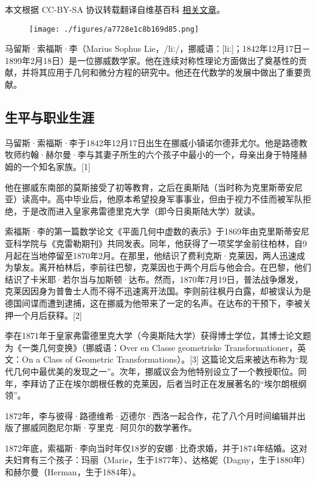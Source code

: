 
本文根据 CC-BY-SA 协议转载翻译自维基百科 \href{https://en.wikipedia.org/wiki/Sophus_Lie}{相关文章}。

\begin{figure}[ht]
\centering
\texttt{[image: ./figures/a7728e1c8b169d85.png]}
\caption{} \label{fig_SFSL_1}
\end{figure}
马留斯·索福斯·李（Marius Sophus Lie，/liː/，挪威语：[liː]；1842年12月17日－1899年2月18日）是一位挪威数学家。他在连续对称性理论方面做出了奠基性的贡献，并将其应用于几何和微分方程的研究中。他还在代数学的发展中做出了重要贡献。
\subsection{生平与职业生涯}
马留斯·索福斯·李于1842年12月17日出生在挪威小镇诺尔德菲尤尔。他是路德教牧师约翰·赫尔曼·李与其妻子所生的六个孩子中最小的一个，母亲出身于特隆赫姆的一个知名家族。[1]

他在挪威东南部的莫斯接受了初等教育，之后在奥斯陆（当时称为克里斯蒂安尼亚）读高中。高中毕业后，他原本希望投身军事事业，但由于视力不佳而被军队拒绝，于是改而进入皇家弗雷德里克大学（即今日奥斯陆大学）就读。

索福斯·李的第一篇数学论文《平面几何中虚数的表示》于1869年由克里斯蒂安尼亚科学院与《克雷勒期刊》共同发表。同年，他获得了一项奖学金前往柏林，自9月起在当地停留至1870年2月。在那里，他结识了费利克斯·克莱因，两人迅速成为挚友。离开柏林后，李前往巴黎，克莱因也于两个月后与他会合。在巴黎，他们结识了卡米耶·若尔当与加斯顿·达布。然而，1870年7月19日，普法战争爆发，克莱因因身为普鲁士人而不得不迅速离开法国。李则前往枫丹白露，却被误认为是德国间谍而遭到逮捕，这在挪威为他带来了一定的名声。在达布的干预下，李被关押一个月后获释。[2]

李在1871年于皇家弗雷德里克大学（今奥斯陆大学）获得博士学位，其博士论文题为《一类几何变换》（挪威语：Over en Classe geometriske Transformationer，英文：On a Class of Geometric Transformations）。[3] 这篇论文后来被达布称为“现代几何中最优美的发现之一”。次年，挪威议会为他特别设立了一个教授职位。同年，李拜访了正在埃尔朗根任教的克莱因，后者当时正在发展著名的“埃尔朗根纲领”。

1872年，李与彼得·路德维希·迈德尔·西洛一起合作，花了八个月时间编辑并出版了挪威同胞尼尔斯·亨里克·阿贝尔的数学著作。

1872年底，索福斯·李向当时年仅18岁的安娜·比奇求婚，并于1874年结婚。这对夫妇育有三个孩子：玛丽（Marie，生于1877年）、达格妮（Dagny，生于1880年）和赫尔曼（Herman，生于1884年）。

